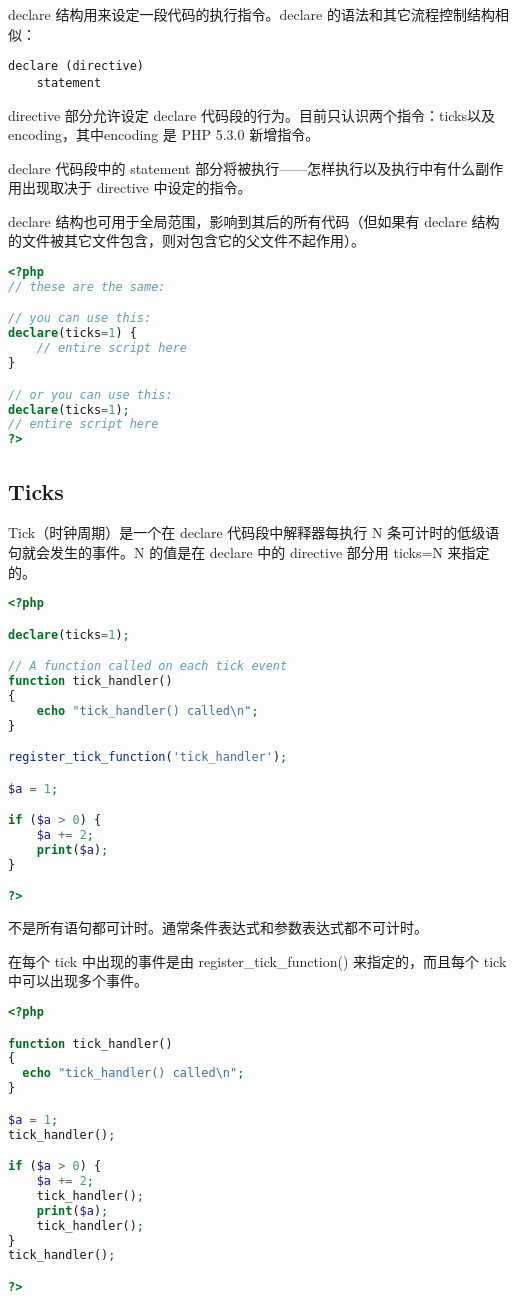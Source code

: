 declare 结构用来设定一段代码的执行指令。declare 的语法和其它流程控制结构相似：

\begin{verbatim}
declare (directive)
    statement
\end{verbatim}

directive 部分允许设定 declare 代码段的行为。目前只认识两个指令：ticks以及 encoding，其中encoding 是 PHP 5.3.0 新增指令。

declare 代码段中的 statement 部分将被执行——怎样执行以及执行中有什么副作用出现取决于 directive 中设定的指令。

declare 结构也可用于全局范围，影响到其后的所有代码（但如果有 declare 结构的文件被其它文件包含，则对包含它的父文件不起作用）。

\begin{lstlisting}[language=PHP]
<?php
// these are the same:

// you can use this:
declare(ticks=1) {
    // entire script here
}

// or you can use this:
declare(ticks=1);
// entire script here
?>
\end{lstlisting}

\subsection{Ticks}

Tick（时钟周期）是一个在 declare 代码段中解释器每执行 N 条可计时的低级语句就会发生的事件。N 的值是在 declare 中的 directive 部分用 ticks=N 来指定的。

\begin{lstlisting}[language=PHP]
<?php

declare(ticks=1);

// A function called on each tick event
function tick_handler()
{
    echo "tick_handler() called\n";
}

register_tick_function('tick_handler');

$a = 1;

if ($a > 0) {
    $a += 2;
    print($a);
}

?>
\end{lstlisting}

不是所有语句都可计时。通常条件表达式和参数表达式都不可计时。

在每个 tick 中出现的事件是由 register\_tick\_function() 来指定的，而且每个 tick 中可以出现多个事件。

\begin{lstlisting}[language=PHP]
<?php

function tick_handler()
{
  echo "tick_handler() called\n";
}

$a = 1;
tick_handler();

if ($a > 0) {
    $a += 2;
    tick_handler();
    print($a);
    tick_handler();
}
tick_handler();

?>
\end{lstlisting}

